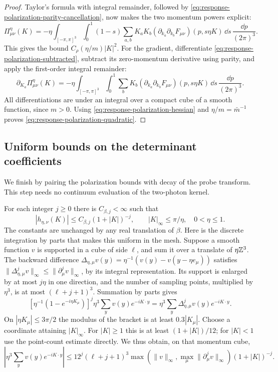 \begin{proof}
Taylor's formula with integral remainder, followed by
\eqref{eq:response-polarization-parity-cancellation}, now makes
the two momentum powers explicit:
\begin{equation}\label{eq:response-polarization-taylor}
 \Pi^\eta_{\mu\nu}(K)=
   -\eta\int_{[-\pi,\pi]^3}\int_0^1(1-s)
      \sum_{a,b}K_aK_b
       (\partial_{k_a}\partial_{k_b}F_{\mu\nu})(p,s\eta K)
                           \,\dd s\,\frac{\dd p}{(2\pi)^3}.
\end{equation}
This gives the bound $C_\rho(\eta/m)|K|^2$.
For the gradient, differentiate
\eqref{eq:response-polarization-subtracted}, subtract its
zero-momentum derivative using parity, and apply the
first-order integral remainder:
\[
 \partial_{K_a}\Pi^\eta_{\mu\nu}(K)=
  -\eta\int_{[-\pi,\pi]^3}\int_0^1
       \sum_bK_b(\partial_{k_a}\partial_{k_b}F_{\mu\nu})(p,s\eta K)
                              \,\dd s\,\frac{\dd p}{(2\pi)^3}.
\]
All differentiations are under an integral over a compact cube
of a smooth function, since $m>0$. Using
\eqref{eq:response-polarization-hessian} and $\eta/m=\bar m^{-1}$
proves \eqref{eq:response-polarization-quadratic}.
\end{proof}

\subsection{Uniform bounds on the determinant coefficients}
\label{subsec:response-uniform-coefficients}

We finish by pairing the polarization bounds with decay of the
probe transform. This step needs no continuum evaluation of
the two-photon kernel.

For each integer $j\ge0$ there is $C_{\beta,j}<\infty$ such that
\begin{equation}\label{eq:response-midpoint-decay}
 |h_{\eta,\nu}(K)|\le C_{\beta,j}(1+|K|)^{-j},
                \qquad |K|_\infty\le\pi/\eta,\quad0<\eta\le1.
\end{equation}
The constants are unchanged by any real translation of $\beta$.
Here is the discrete integration by parts that makes this
uniform in the mesh. Suppose a smooth function $v$ is supported
in a cube of side $\ell$, and sum it over a translate of $\eta\mathbb Z^3$.
The backward difference
$\Delta_{\eta,\mu}v(y)=\eta^{-1}(v(y)-v(y-\eta e_\mu))$
satisfies
$\|\Delta_{\eta,\mu}^jv\|_\infty
\le\|\partial_\mu^jv\|_\infty$, by its integral representation.
Its support is enlarged by at most $j\eta$ in one direction,
and the number of sampling points, multiplied by $\eta^3$,
is at most $(\ell+j+1)^3$. Summation by parts gives
\[
 [\eta^{-1}(1-e^{-i\eta K_\mu})]^j
       \eta^3\sum_yv(y)e^{-iK\cdot y}
          =\eta^3\sum_y\Delta_{\eta,\mu}^jv(y)e^{-iK\cdot y}.
\]
On $|\eta K_\mu|\le3\pi/2$ the modulus of the bracket
is at least $0.3|K_\mu|$. Choose a coordinate attaining
$|K|_\infty$. For $|K|\ge1$ this is at least
$(1+|K|)/12$; for $|K|<1$ use the point-count estimate directly.
We thus obtain, on that momentum cube,
\[
 \left|\eta^3\sum_yv(y)e^{-iK\cdot y}\right|
 \le12^j(\ell+j+1)^3
       \max(\|v\|_\infty,\max_\mu\|\partial_\mu^jv\|_\infty)
                                               (1+|K|)^{-j}.
\]

